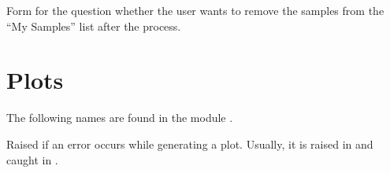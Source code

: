 \documentclass[a4paper,11pt,english]{sphinxmanual}
\begin{document}

\begin{fulllineitems}
\label{programming/utilities:samples.utils.views.RemoveFromMySamplesForm}
Form for the question whether the user wants to remove the samples
from the “My Samples” list after the process.

\end{fulllineitems}



\section{Plots}
\label{programming/utilities:plots}
The following names are found in the module .

\begin{fulllineitems}
\label{programming/utilities:samples.utils.plots.PlotError}
Raised if an error occurs while generating a plot.  Usually, it is raised in
 and caught in
.

\end{fulllineitems}

\end{document}
